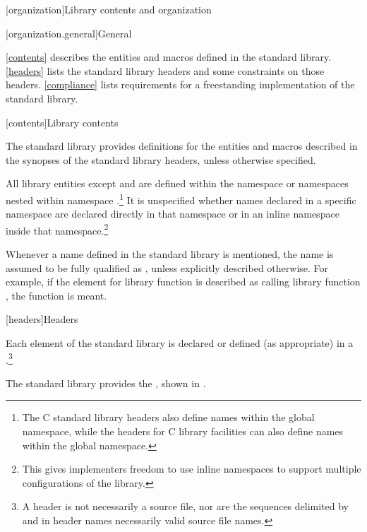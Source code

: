 [organization]{Library contents and organization}

[organization.general]{General}

\pnum
\ref{contents} describes the entities and macros defined in the \Cpp{} standard library.
\ref{headers} lists the standard library headers and some constraints on those headers.
\ref{compliance} lists requirements for a freestanding implementation of the \Cpp{}
standard library.

[contents]{Library contents}

\pnum
The \Cpp{} standard library provides definitions
for the entities and macros described in the synopses
of the \Cpp{} standard library headers,
unless otherwise specified.

\pnum
All library entities except
and
are defined within the namespace
or namespaces nested within namespace
.\footnote{The C standard library headers also define
names within the global namespace, while the \Cpp{} headers for C library
facilities can also define names within the global namespace.}%
It is unspecified whether names declared in a specific namespace are declared
directly in that namespace or in an inline namespace inside that
namespace.\footnote{This gives implementers freedom to use inline namespaces to
support multiple configurations of the library.}

\pnum
Whenever a name  defined in the standard library is mentioned,
the name  is assumed to be fully qualified as
,
unless explicitly described otherwise. For example, if the \effects element
for library function  is described as calling library function ,
the function
is meant.

[headers]{Headers}

\pnum
Each element of the \Cpp{} standard library is declared or defined (as appropriate) in a
.\footnote{A header is not necessarily a source file, nor are the
sequences delimited by \tcode{<} and \tcode{>} in header names necessarily valid source
file names.}

\pnum
The \Cpp{} standard library provides the
,
shown in .


